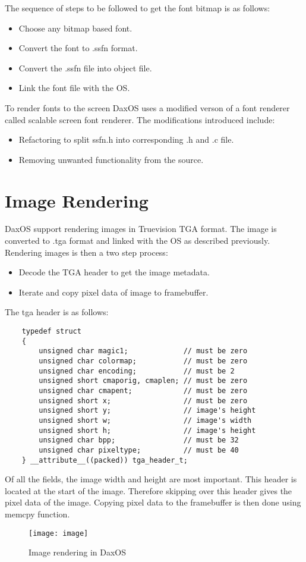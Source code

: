 The sequence of steps to be followed to get the font bitmap is as follows:
\begin{itemize}
    \item Choose any bitmap based font.
    \item Convert the font to .ssfn format.
    \item Convert the .ssfn file into object file.
    \item Link the font file with the OS. 
\end{itemize}

To render fonts to the screen DaxOS uses a modified verson of a font renderer called scalable screen font renderer.
The modifications introduced include:
\begin{itemize}
    \item Refactoring to split ssfn.h into corresponding .h and .c file.
    \item Removing unwanted functionality from the source.
\end{itemize}

\pagebreak
\section{Image Rendering}\label{section:Image Rendering}
DaxOS support rendering images in Truevision TGA format. The image is converted to .tga format and linked with the OS as described
previously.
Rendering images is then a two step process:
\begin{itemize}
    \item Decode the TGA header to get the image metadata.
    \item Iterate and copy pixel data of image to framebuffer.
\end{itemize}

The tga header is as follows:
\begin{lstlisting}
    typedef struct
    {
        unsigned char magic1;             // must be zero
        unsigned char colormap;           // must be zero
        unsigned char encoding;           // must be 2
        unsigned short cmaporig, cmaplen; // must be zero
        unsigned char cmapent;            // must be zero
        unsigned short x;                 // must be zero
        unsigned short y;                 // image's height
        unsigned short w;                 // image's width
        unsigned short h;                 // image's height
        unsigned char bpp;                // must be 32
        unsigned char pixeltype;          // must be 40
    } __attribute__((packed)) tga_header_t;
\end{lstlisting}

Of all the fields, the image width and height are most important. This header is located at the start of the image.
Therefore skipping over this header gives the pixel data of the image. 
Copying pixel data to the framebuffer is then done using memcpy function.

\begin{figure}[h!]
	\texttt{[image: image]}
	\caption{Image rendering in DaxOS}
\end{figure}
\clearpage